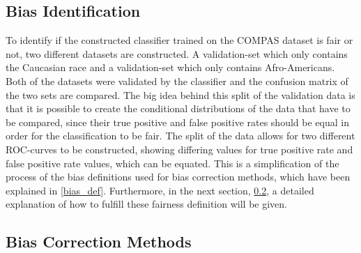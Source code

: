 \documentclass[11pt, fleqn, titlepage]{article}
\begin{document}
	
	\subsection{Bias Identification}\label{bias_id}
	To identify if the constructed classifier trained on the COMPAS dataset is fair or not, two different datasets are constructed. A validation-set which only contains the Caucasian race and a validation-set which only contains Afro-Americans. Both of the datasets were validated by the classifier and the confusion matrix of the two sets are compared. The big idea behind this split of the validation data is that it is possible to create the conditional distributions of the data that have to be compared, since their true positive and false positive rates should be equal in order for the classification to be fair. The split of the data allows for two different ROC-curves to be constructed, showing differing values for true positive rate and false positive rate values, which can be equated. This is a simplification of the process of the bias definitions used for bias correction methods, which have been explained in \ref{bias_def}. Furthermore, in the next section, \ref{biascorr}, a detailed explanation of how to fulfill these fairness definition will be given. 
	
	\subsection{Bias Correction Methods}\label{biascorr}
	
\end{document}
